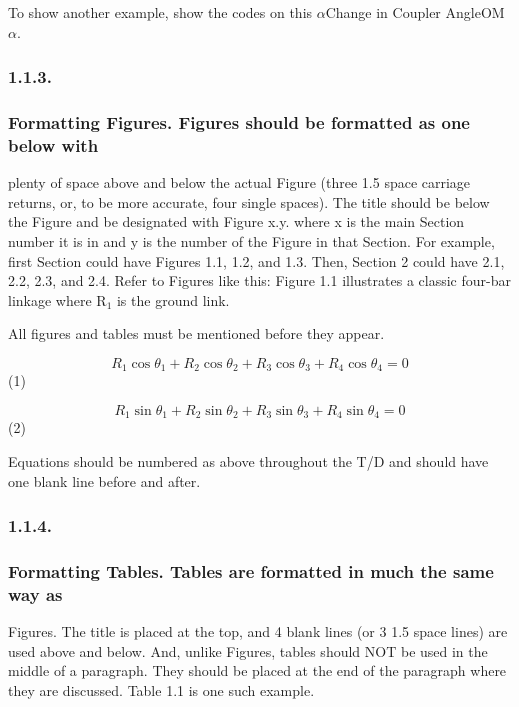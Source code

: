 \documentclass{article}
\newcommand{\tab}{\hspace{5mm}}
\begin{document}
To show another example, show the codes on this 
\ensuremath{\alpha}\tab Change in Coupler AngleOM\ensuremath{\alpha}.\\


\subsubsection*{1.1.3.\tab }


\subsubsection*{
Formatting Figures. Figures should be formatted as one below with }

plenty of space above and below the actual Figure (three 1.5 
space carriage returns, or, to be more accurate, four single 
spaces). The title should be below the Figure and be designated 
with Figure x.y. where x is the main Section number it is in 
and y is the number of the Figure in that Section. For example, 
first Section could have Figures 1.1, 1.2, and 1.3. Then, Section 
2 could have 2.1, 2.2, 2.3, and 2.4. Refer to Figures like this: Figure 
1.1 illustrates a classic four-bar linkage where R$_{1}$ is the ground 
link.



All figures and tables must be mentioned before they appear.


\[R_{1} \cos \theta _{1} +R_{2} \cos \theta _{2} +R_{3} \cos \theta _{3}
+R_{4} \cos \theta _{4} =0
\]\tab \tab \tab (1)


\[R_{1} \sin \theta _{1} +R_{2} \sin \theta _{2} +R_{3} \sin \theta _{3}
+R_{4} \sin \theta _{4} =0
\]\tab \tab \tab (2)



Equations should be numbered as above throughout the T/D and 
should have one blank line before and after. 




\subsubsection*{1.1.4.\tab }


\subsubsection*{
Formatting Tables. Tables are formatted in much the same way as}

Figures. The title is placed at the top, and 4 blank lines (or 
3 1.5 space lines) are used above and below. And, unlike Figures, 
tables should NOT be used in the middle of a paragraph. They 
should be placed at the end of the paragraph where they are discussed. 
Table 1.1 is one such example.
\end{document}
